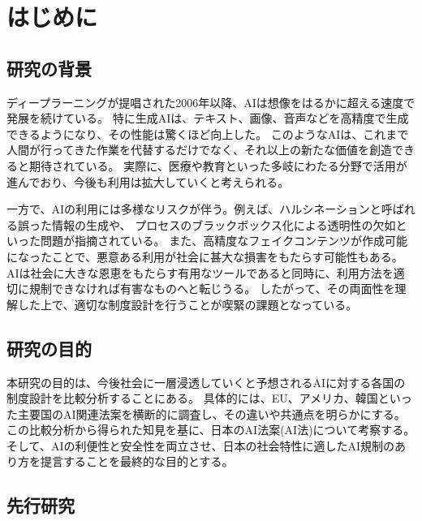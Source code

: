 \chapter{はじめに}

\section{研究の背景}
ディープラーニングが提唱された2006年以降、AIは想像をはるかに超える速度で発展を続けている。
特に生成AIは、テキスト、画像、音声などを高精度で生成できるようになり、その性能は驚くほど向上した。
このようなAIは、これまで人間が行ってきた作業を代替するだけでなく、それ以上の新たな価値を創造できると期待されている。
実際に、医療や教育といった多岐にわたる分野で活用が進んでおり、今後も利用は拡大していくと考えられる。

一方で、AIの利用には多様なリスクが伴う。例えば、ハルシネーションと呼ばれる誤った情報の生成や、
プロセスのブラックボックス化による透明性の欠如といった問題が指摘されている。
また、高精度なフェイクコンテンツが作成可能になったことで、悪意ある利用が社会に甚大な損害をもたらす可能性もある。
AIは社会に大きな恩恵をもたらす有用なツールであると同時に、利用方法を適切に規制できなければ有害なものへと転じうる。
したがって、その両面性を理解した上で、適切な制度設計を行うことが喫緊の課題となっている。


\section{研究の目的}
本研究の目的は、今後社会に一層浸透していくと予想されるAIに対する各国の制度設計を比較分析することにある。
具体的には、EU、アメリカ、韓国といった主要国のAI関連法案を横断的に調査し、その違いや共通点を明らかにする。
この比較分析から得られた知見を基に、日本のAI法案(AI法)について考察する。
そして、AIの利便性と安全性を両立させ、日本の社会特性に適したAI規制のあり方を提言することを最終的な目的とする。

\section{先行研究}


